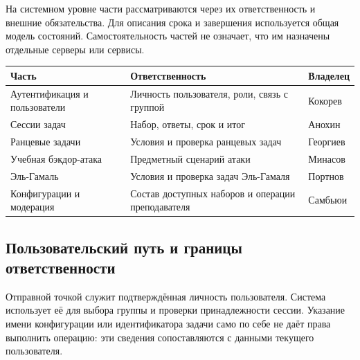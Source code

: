\documentclass[12pt,a4paper]{article}
\begin{document}
На системном уровне части рассматриваются через их ответственность и внешние обязательства. Для описания срока и завершения используется общая модель состояний. Самостоятельность частей не означает, что им назначены отдельные серверы или сервисы.

{\def\LTcaptype{none} %
\begin{longtable}[]{@{}
  >{\raggedright\arraybackslash}p{}
  >{\raggedright\arraybackslash}p{}
  >{\raggedright\arraybackslash}p{}@{}}
\toprule\noalign{}
\begin{minipage}[b]{\linewidth}\raggedright
Часть
\end{minipage} & \begin{minipage}[b]{\linewidth}\raggedright
Ответственность
\end{minipage} & \begin{minipage}[b]{\linewidth}\raggedright
Владелец
\end{minipage} \\
\midrule\noalign{}
\endhead
\bottomrule\noalign{}
\endlastfoot
Аутентификация и пользователи & Личность пользователя, роли, связь с группой & Кокорев \\
Сессии задач & Набор, ответы, срок и итог & Анохин \\
Ранцевые задачи & Условия и проверка ранцевых задач & Георгиев \\
Учебная бэкдор-атака & Предметный сценарий атаки & Минасов \\
Эль-Гамаль & Условия и проверка задач Эль-Гамаля & Портнов \\
Конфигурации и модерация & Состав доступных наборов и операции преподавателя & Самбьюи \\
\end{longtable}
}

\subsection{Пользовательский путь и границы ответственности}\label{ux43fux43eux43bux44cux437ux43eux432ux430ux442ux435ux43bux44cux441ux43aux438ux439-ux43fux443ux442ux44c-ux438-ux433ux440ux430ux43dux438ux446ux44b-ux43eux442ux432ux435ux442ux441ux442ux432ux435ux43dux43dux43eux441ux442ux438}

\hypertarget{пользовательский-путь-и-границы-ответственности}{}

Отправной точкой служит подтверждённая личность пользователя. Система использует её для выбора группы и проверки принадлежности сессии. Указание имени конфигурации или идентификатора задачи само по себе не даёт права выполнить операцию: эти сведения сопоставляются с данными текущего пользователя.
\end{document}
